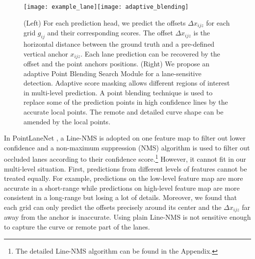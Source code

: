 \documentclass[runningheads]{llncs}
\begin{document}
\begin{figure}[tb]


\begin{centering}
\texttt{[image: example\_lane]}\texttt{[image: adaptive\_blending]}
\par\end{centering}


\caption{\label{fig:The-anchor-proposal-based}(Left) For each prediction head,
we predict the offsets $\varDelta x_{ijz}$ for each grid $g_{ij}$
and their corresponding scores. The offset $\varDelta x_{ijz}$ is
the horizontal distance between the ground truth and a pre-defined
vertical anchor $x_{ijz}$. Each lane prediction can be recovered
by the offset and the point anchors positions. (Right) We propose
an adaptive Point Blending Search Module for a lane-sensitive detection.
Adaptive score masking allows different regions of interest in multi-level
prediction. A point blending technique is used to replace some
of the prediction points in high confidence lines by the accurate
local points. The remote and detailed curve shape can be amended by
the local points.}

\end{figure}

In PointLaneNet \cite{chen2019pointlanenet}, a Line-NMS is adopted
on one feature map to filter out lower confidence and a non-maximum
suppression (NMS) algorithm is used to filter out occluded lanes according
to their confidence score.\footnote{The detailed Line-NMS algorithm can be found in the Appendix.}
However, it cannot fit in our multi-level situation. First, predictions
from different levels of features cannot be treated equally. For example,
predictions on the low-level feature map are more accurate in a short-range
while predictions on high-level feature map are more consistent in
a long-range but losing a lot of details. Moreover, we found that
each grid can only predict the offsets precisely around its center
and the $\varDelta x_{ijz}$ far away from the anchor is inaccurate.
Using plain Line-NMS is not sensitive enough to capture the curve
or remote part of the lanes.
\end{document}
